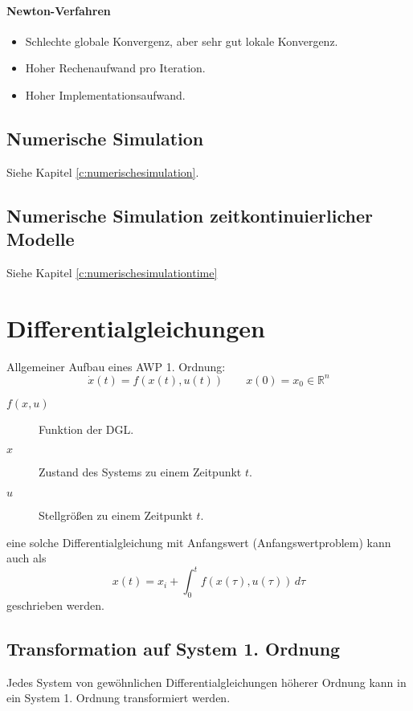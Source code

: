 			\paragraph{Newton-Verfahren}
				\begin{itemize}
					\item Schlechte globale Konvergenz, aber sehr gut lokale Konvergenz.
					\item Hoher Rechenaufwand pro Iteration.
					\item Hoher Implementationsaufwand.
				\end{itemize}

		\subsection{Numerische Simulation} %
			Siehe Kapitel \ref{c:numerischesimulation}.

		\subsection{Numerische Simulation zeitkontinuierlicher Modelle} %
			Siehe Kapitel \ref{c:numerischesimulationtime}

	\section{Differentialgleichungen} %
		Allgemeiner Aufbau eines AWP 1. Ordnung:
		\begin{equation*}
			\dot{x}(t) = f(x(t), u(t)) \quad\quad x(0) = x _ 0 \in \mathbb{R} ^ n
		\end{equation*}
		\begin{description}
			\item[\( f(x, u) \)] Funktion der DGL.
			\item[\( x \)] Zustand des Systems zu einem Zeitpunkt \( t \).
			\item[\( u \)] Stellgrößen zu einem Zeitpunkt \( t \).
		\end{description}

		eine solche Differentialgleichung mit Anfangswert (Anfangswertproblem) kann auch als
		\begin{equation*}
			x(t) = x _ i + \int_{0}^{t} \! f(x(\tau), u(\tau)) \, d\!\tau
		\end{equation*}
		geschrieben werden.

		\subsection{Transformation auf System 1. Ordnung} %
			Jedes System von gewöhnlichen Differentialgleichungen höherer Ordnung kann in ein System 1. Ordnung transformiert werden.

